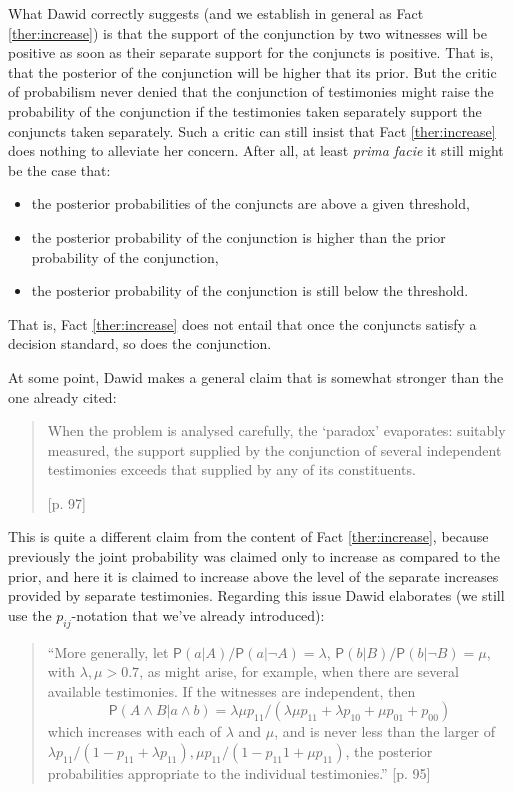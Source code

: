 \documentclass[10pt,dvipsnames,enabledeprecatedfontcommands]{scrartcl}
\newcommand{\n}{\neg}
\newcommand{\et}{\wedge}
\newcommand{\pr}[1]{\mathsf{P}(#1)}
\begin{document}
What Dawid correctly suggests (and we establish in general as Fact
\ref{ther:increase}) is that the support of the conjunction by two
witnesses will be positive as soon as their separate support for the
conjuncts is positive. That is, that the posterior of the conjunction
will be higher that its prior. But the critic of probabilism never
denied that the conjunction of testimonies might raise the probability
of the conjunction if the testimonies taken separately support the
conjuncts taken separately. Such a critic can still insist that Fact
\ref{ther:increase} does nothing to alleviate her concern. After all, at
least \emph{prima facie} it still might be the case that:

\begin{itemize}
\item  the posterior probabilities of the conjuncts are above a given threshold,
\item   the posterior probability of the conjunction is higher than the prior probability of the conjunction,
\item   the posterior probability of the conjunction 
 is still below the threshold.
\end{itemize}

That is, Fact \ref{ther:increase} does not entail that once the
conjuncts satisfy a decision standard, so does the conjunction.

At some point, Dawid makes a general claim that is somewhat stronger
than the one already cited:

\begin{quote} When the problem is analysed carefully, the `paradox' evaporates: suitably measured, the support supplied by the conjunction of several independent testimonies exceeds that supplied by any of its constituents.

  [p. 97]\end{quote}

This is quite a different claim from the content of Fact
\ref{ther:increase}, because previously the joint probability was
claimed only to increase as compared to the prior, and here it is
claimed to increase above the level of the separate increases provided
by separate testimonies. Regarding this issue Dawid elaborates (we still
use the \(p_{ij}\)-notation that we've already introduced):

\begin{quote}
 ``More generally, let $\pr{a\vert A}/\pr{a\vert \n A}=\lambda$, $\pr{b\vert B}/\pr{b\vert \n B}=\mu$, with $\lambda, \mu >0.7$, as might arise, for example, when there are several available testimonies. If the witnesses are
  independent, then \[\pr{A\et B\vert  a\et b} = \lambda \mu p_{11}/(\lambda \mu p_{11} + \lambda p_{10} +\mu p_{01} + p_{00})\] which  increases with
 each of $\lambda$ and $\mu$, and is never less than the larger of $\lambda p_{11}/(1-p_{11}+\lambda p_{11}),
 \mu p_{11} /(1- p_{11} 1 + \mu p_{11})$, the posterior probabilities appropriate to the individual testimonies.'' [p. 95]
 \end{quote}
\end{document}
